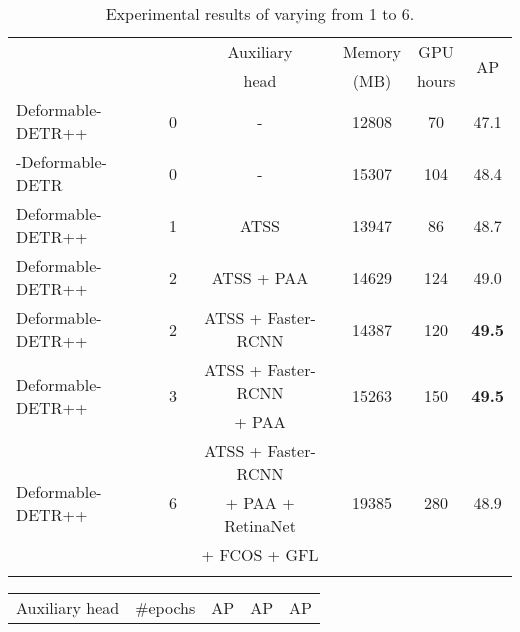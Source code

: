 \begin{table}[t]
    \centering\setlength{\tabcolsep}{6pt}
    \footnotesize
    \renewcommand{\arraystretch}{1.3}
    \resizebox{\linewidth}{!}
    {
        \begin{tabular}{l|c|c|c|c|c}
        \shline
        \multirow{2}{*}{Method} & \multirow{2}{*}{} & Auxiliary & Memory & GPU & \multirow{2}{*}{AP}  \\
        & & head & (MB) & hours & \\         
        \shline
        Deformable-DETR++ & 0 & - & 12808 & 70 & 47.1 \\ 
        \hline
        -Deformable-DETR & 0 & - & 15307 & 104 & 48.4 \\
        \hline
        \cellcolor{gray!20}Deformable-DETR++ & \cellcolor{gray!20}1 & \cellcolor{gray!20}ATSS & \cellcolor{gray!20}13947 & \cellcolor{gray!20}86 & \cellcolor{gray!20}48.7 \\ 
        \hline
        Deformable-DETR++ & 2 & ATSS + PAA & 14629 & 124 & 49.0 \\ 
        \hline
        \cellcolor{gray!20}Deformable-DETR++ & \cellcolor{gray!20}2 & \cellcolor{gray!20}ATSS + Faster-RCNN & \cellcolor{gray!20}14387 & \cellcolor{gray!20}120 & \cellcolor{gray!20}\textbf{49.5} \\ 
        \hline
        \multirow{2}{*}{Deformable-DETR++} & \multirow{2}{*}{3} & ATSS + Faster-RCNN & \multirow{2}{*}{15263} & \multirow{2}{*}{150} & \multirow{2}{*}{\textbf{49.5}} \\ 
         & & + PAA & & & \\
\hline
        \multirow{3}{*}{Deformable-DETR++} & \multirow{3}{*}{6} & ATSS + Faster-RCNN & \multirow{3}{*}{19385} & \multirow{3}{*}{280} & \multirow{3}{*}{48.9} \\ 
         & & + PAA + RetinaNet & & & \\
         & & + FCOS + GFL & & & \\
\shline
        \end{tabular}
    }
    \vspace{-2mm}
    \caption{\small{Experimental results of  varying from 1 to 6.}
    }
    \label{tab:multi_head}
\end{table} \begin{table}[t]
    \centering\setlength{\tabcolsep}{6pt}
    \footnotesize
    \renewcommand{\arraystretch}{1.2}
    \resizebox{0.9\linewidth}{!}
    {
        \begin{tabular}{l|c|c|c|c}
        \shline
        Auxiliary head  & \#epochs  & AP & AP & AP \\

\end{tabular}}
\end{table}
